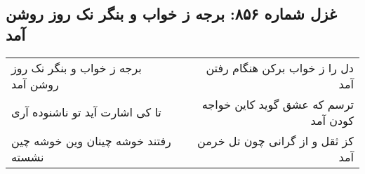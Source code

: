 \begin{center}
\section*{غزل شماره ۸۵۶: برجه ز خواب و بنگر نک روز روشن آمد}
\label{sec:0856}
\begin{longtable}{l p{0.5cm} r}
برجه ز خواب و بنگر نک روز روشن آمد
&&
دل را ز خواب برکن هنگام رفتن آمد
\\
تا کی اشارت آید تو ناشنوده آری
&&
ترسم که عشق گوید کاین خواجه کودن آمد
\\
رفتند خوشه چینان وین خوشه چین نشسته
&&
کز ثقل و از گرانی چون تل خرمن آمد
\\
\end{longtable}
\end{center}
